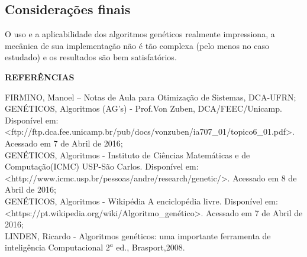 \documentclass[12pt,a4paper]{article}
\begin{document}
\newpage
\thispagestyle{main}
\subsection{Considerações finais}

O uso e a aplicabilidade dos algoritmos genéticos realmente impressiona, a mecânica de sua implementação não é tão complexa (pelo menos no caso estudado) e os resultados são bem satisfatórios.

\newpage
\thispagestyle{main}

\begin{flushleft}
{\large \textbf{REFERÊNCIAS}}\\
\vspace{0.5cm}

\hspace{4ex}FIRMINO, Manoel – Notas de Aula para Otimização de Sistemas, DCA-UFRN;\\
\vspace{0.8cm}
\hspace{4ex}GENÉTICOS, Algoritmos (AG's) - Prof.Von Zuben, DCA/FEEC/Unicamp. Disponível em: <ftp://ftp.dca.fee.unicamp.br/pub/docs/vonzuben/ia707\_01/topico6\_01.pdf>. Acessado em 7 de Abril de 2016;\\
\vspace{0.8cm}
\hspace{4ex}GENÉTICOS, Algoritmos - Instituto de Ciências Matemáticas e de Computação(ICMC) USP-São Carlos. Disponível em: <http://www.icmc.usp.br/pessoas/andre/research/genetic/>. Acessado em 8 de Abril de 2016;\\
\vspace{0.8cm}
\hspace{4ex}GENÉTICOS, Algoritmos - Wikipédia A enciclopédia livre. Disponível em: <https://pt.wikipedia.org/wiki/Algoritmo\_genético>. Acessado em 7 de Abril de 2016;\\
\vspace{0.8cm}
\hspace{4ex}LINDEN, Ricardo - Algoritmos genéticos: uma importante ferramenta de inteligência Computacional $2^a$ ed., Brasport,2008.\\
\vspace{0.8cm}

\end{flushleft}

\vspace{3cm}

%
\end{document}
